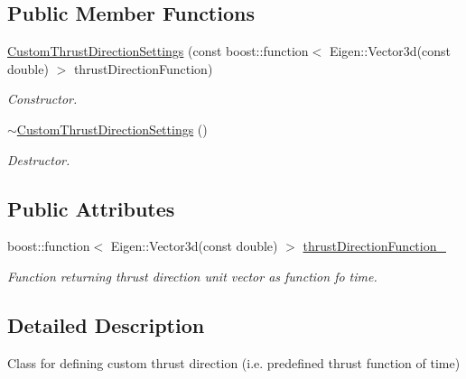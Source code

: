 \subsection*{Public Member Functions}
\begin{DoxyCompactItemize}
\item 
\hyperlink{classtudat_1_1simulation__setup_1_1CustomThrustDirectionSettings_a8f2b1acde5110104b90e22fd512bd2f6}{Custom\+Thrust\+Direction\+Settings} (const boost\+::function$<$ Eigen\+::\+Vector3d(const double) $>$ thrust\+Direction\+Function)
\begin{DoxyCompactList}\small\item\em Constructor. \end{DoxyCompactList}\item 
\hyperlink{classtudat_1_1simulation__setup_1_1CustomThrustDirectionSettings_a786819cc80c6511220c76a4fa163c619}{$\sim$\+Custom\+Thrust\+Direction\+Settings} ()\hypertarget{classtudat_1_1simulation__setup_1_1CustomThrustDirectionSettings_a786819cc80c6511220c76a4fa163c619}{}\label{classtudat_1_1simulation__setup_1_1CustomThrustDirectionSettings_a786819cc80c6511220c76a4fa163c619}

\begin{DoxyCompactList}\small\item\em Destructor. \end{DoxyCompactList}\end{DoxyCompactItemize}
\subsection*{Public Attributes}
\begin{DoxyCompactItemize}
\item 
boost\+::function$<$ Eigen\+::\+Vector3d(const double) $>$ \hyperlink{classtudat_1_1simulation__setup_1_1CustomThrustDirectionSettings_a0bcf1b5f17f13a30c4506bca92490bec}{thrust\+Direction\+Function\+\_\+}\hypertarget{classtudat_1_1simulation__setup_1_1CustomThrustDirectionSettings_a0bcf1b5f17f13a30c4506bca92490bec}{}\label{classtudat_1_1simulation__setup_1_1CustomThrustDirectionSettings_a0bcf1b5f17f13a30c4506bca92490bec}

\begin{DoxyCompactList}\small\item\em Function returning thrust direction unit vector as function fo time. \end{DoxyCompactList}\end{DoxyCompactItemize}


\subsection{Detailed Description}
Class for defining custom thrust direction (i.\+e. predefined thrust function of time) 

